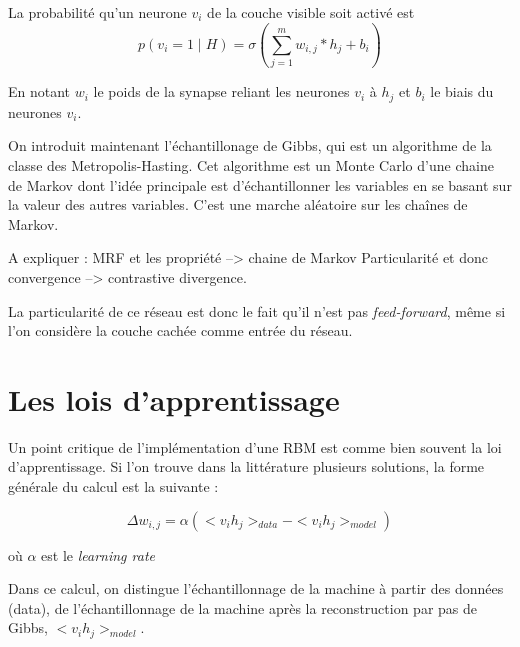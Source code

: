\documentclass[a4paper,oneside]{report}
\begin{document}
                La probabilité qu'un neurone \begin{math}v_{i}\end{math} de la
                couche visible soit activé est \begin{equation}p( v_{i} =1 \mid H) = \sigma(\sum_{j=1}^{m} w_{i,j} * h_{j} + b_{i}) \end{equation}

 En notant \textit{$w_{i}$} le poids de la synapse reliant les neurones \textit{$v_{i}$} à \textit{$h_{j}$} et \textit{$b_{i}$} le biais du neurones \textit{$v_{i}$}.
        
	     On introduit maintenant l'échantillonage de Gibbs, qui est un
                algorithme de la classe des Metropolis-Hasting. Cet algorithme
                est un Monte Carlo d'une chaine de Markov dont l'idée principale
                est d'échantillonner les variables en se basant sur la valeur
                des autres variables. C'est une marche aléatoire sur les chaînes
                de Markov.

                A expliquer : MRF et les propriété --> chaine de Markov
                Particularité et donc convergence --> contrastive divergence.

                La particularité de ce réseau est donc le fait qu'il n'est pas
                \textit{feed-forward}, même si l'on considère la couche cachée comme entrée du
                réseau.


            \section{Les lois d'apprentissage}

                Un point critique de l'implémentation d'une RBM est comme bien souvent la loi d'apprentissage.
                Si l'on trouve dans la littérature plusieurs solutions, la forme générale du calcul est la suivante :

                \begin{equation}
                    \Delta w_{i,j} = \alpha (<v_{i}h_{j}>_{data} - <v_{i}h_{j}>_{model} )
                \end{equation}
                
                où \begin{math}\alpha\end{math} est le \textit{learning rate}

                Dans ce calcul, on distingue l'échantillonnage de la machine à partir des données (data), de l'échantillonnage de la machine après la reconstruction par pas de Gibbs, \begin{math}<v_{i}h_{j}>_{model}\end{math}.\\
                
\end{document}

